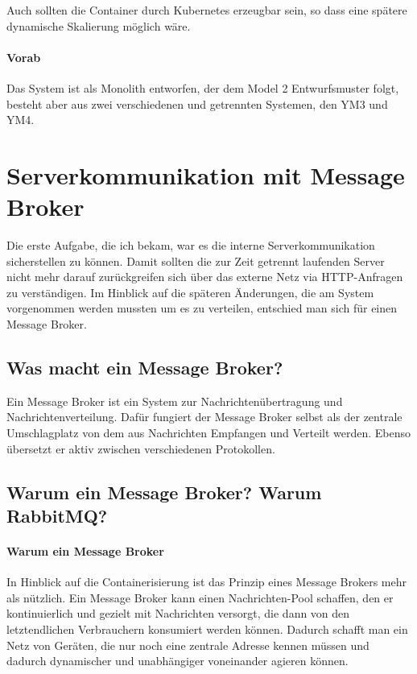 \documentclass[12pt,a4paper]{article}
\begin{document}
Auch sollten die Container durch \gls{Kubernetes} erzeugbar sein, so dass eine spätere dynamische Skalierung möglich wäre.

\paragraph{Vorab}
Das System ist als Monolith entworfen, der dem Model 2 Entwurfsmuster folgt, besteht aber aus zwei verschiedenen und getrennten Systemen, den YM3 und YM4. 


\section{Serverkommunikation mit Message Broker} \label{rabbit}
Die erste Aufgabe, die ich bekam, war es die interne Serverkommunikation sicherstellen zu können. Damit sollten die zur Zeit getrennt laufenden Server nicht mehr darauf zurückgreifen sich über das externe Netz via \gls{HTTP}-Anfragen zu verständigen. Im Hinblick auf die späteren Änderungen, die am System vorgenommen werden mussten um es zu verteilen, entschied man sich für einen Message Broker.

\subsection{Was macht ein Message Broker?}
Ein Message Broker ist ein System zur Nachrichtenübertragung und Nachrichtenverteilung. Dafür fungiert der Message Broker selbst als der zentrale Umschlagplatz von dem aus Nachrichten Empfangen und Verteilt werden. Ebenso übersetzt er aktiv zwischen verschiedenen Protokollen\cite{mesBro}. 

\subsection{Warum ein Message Broker? Warum RabbitMQ?}
\paragraph{Warum ein Message Broker}
In Hinblick auf die Containerisierung ist das Prinzip eines Message Brokers mehr als nützlich.
Ein Message Broker kann einen Nachrichten-Pool schaffen, den er kontinuierlich und gezielt mit Nachrichten versorgt, die dann von den letztendlichen Verbrauchern konsumiert werden können. Dadurch schafft man ein Netz von Geräten, die nur noch eine zentrale Adresse kennen müssen und dadurch dynamischer und unabhängiger voneinander agieren können. 
\end{document}
